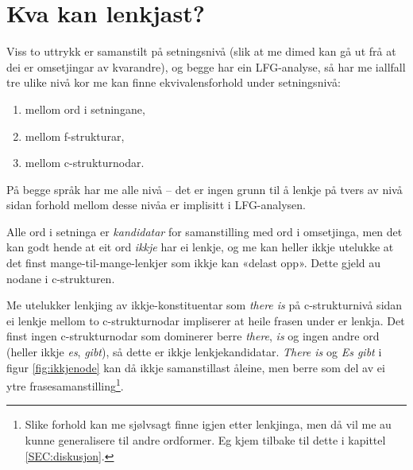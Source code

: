 \documentclass[11pt,a4paper,oneside,draft]{book}
\begin{document}
\section{Kva kan lenkjast?}
\label{sec-3.4}

\label{SEC:kandidatar}

Viss to uttrykk er samanstilt på setningsnivå (slik at me dimed kan gå
ut frå at dei er omsetjingar av kvarandre), og begge har ein
LFG-analyse, så har me iallfall tre ulike nivå kor me kan finne
ekvivalensforhold under setningsnivå:
\begin{enumerate}
\item mellom ord i setningane,
\item mellom f-strukturar,
\item mellom c-strukturnodar.
\end{enumerate}
På begge språk har me alle nivå -- det er ingen grunn til å lenkje på
tvers av nivå sidan forhold mellom desse nivåa er implisitt i
LFG-analysen.

Alle ord i setninga er \emph{kandidatar} for samanstilling med ord i
omsetjinga, men det kan godt hende at eit ord \emph{ikkje} har ei lenkje,
og me kan heller ikkje utelukke at det finst mange-til-mange-lenkjer
som ikkje kan «delast opp». Dette gjeld au nodane i c-strukturen.

Me utelukker lenkjing av ikkje-konstituentar som \emph{there is} på
c-strukturnivå sidan ei lenkje mellom to c-strukturnodar impliserer at
heile frasen under er lenkja. Det finst ingen c-strukturnodar som
dominerer berre \emph{there}, \emph{is} og ingen andre ord (heller ikkje \emph{es},
\emph{gibt}), så dette er ikkje lenkjekandidatar.  \emph{There is} og \emph{Es gibt}
i figur \ref{fig:ikkjenode} kan då ikkje samanstillast åleine, men
berre som del av ei ytre frasesamanstilling\footnote{Slike forhold kan me sjølvsagt finne igjen etter lenkjinga,
        men då vil me au kunne generalisere til andre ordformer. Eg
        kjem tilbake til dette i kapittel \ref{SEC:diskusjon}. }.
\end{document}
